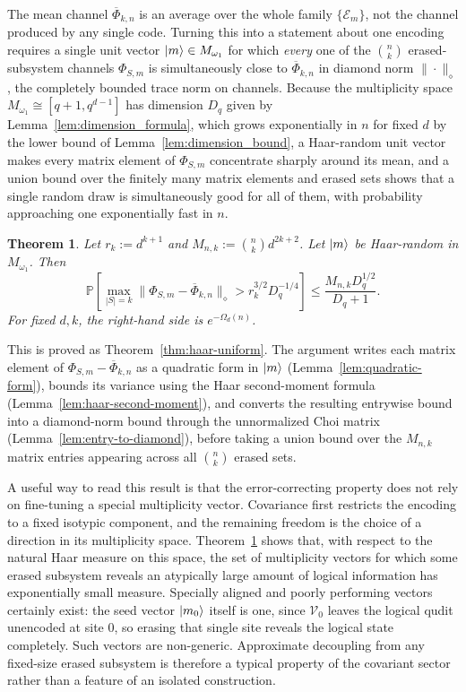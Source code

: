 \documentclass[10pt,twocolumn,superscriptaddress,aps,amsmath,amssymb,citeautoscript,floatfix,prx]{revtex4-2}
\newtheorem{theorem}{Theorem}
\theoremstyle{plain}
\theoremstyle{plain}
\theoremstyle{plain}
\theoremstyle{plain}
\theoremstyle{plain}
\theoremstyle{plain}
\theoremstyle{plain}
\theoremstyle{definition}
\theoremstyle{plain}
\begin{document}
The mean channel $\overline\Phi_{k,n}$ is an average over the whole family $\{\mathcal E_m\}$, not the channel produced by any single code. 
Turning this into a statement about one encoding requires a single unit vector $\ket m\in M_{\omega_1}$ for which \emph{every} one of the $\binom nk$ erased-subsystem channels $\Phi_{S,m}$ is 
simultaneously close to $\overline\Phi_{k,n}$ in diamond norm $\|\cdot\|_\diamond$, the completely bounded trace norm on channels. 
Because the multiplicity space $M_{\omega_1}\cong[q+1,q^{d-1}]$ has dimension $D_q$ given by Lemma~\ref{lem:dimension_formula}, 
which grows exponentially in $n$ for fixed $d$ by the lower bound of Lemma~\ref{lem:dimension_bound}, a Haar-random unit vector makes every 
matrix element of $\Phi_{S,m}$ concentrate sharply around its mean, and a union bound over the finitely many matrix elements and erased sets shows that a single random draw 
is simultaneously good for all of them, with probability approaching one exponentially fast in $n$.

\begin{theorem}\label{thrm:main_haar_typical}
Let $r_k:=d^{k+1}$ and $M_{n,k}:=\binom nk d^{2k+2}$. Let $\ket m$ be Haar-random in $M_{\omega_1}$. Then
$$
\mathbb P\left[
\max_{|S|=k}
\|\Phi_{S,m}-\overline\Phi_{k,n}\|_\diamond
>r_k^{3/2}D_q^{-1/4}
\right]
\le
\frac{M_{n,k}D_q^{1/2}}{D_q+1}.
$$
For fixed $d,k$, the right-hand side is $e^{-\Omega_d(n)}$.
\end{theorem}

This is proved as Theorem~\ref{thm:haar-uniform}. The argument writes each matrix element of $\Phi_{S,m}-\overline\Phi_{k,n}$ as a quadratic form
in $\ket m$ (Lemma~\ref{lem:quadratic-form}), bounds its variance using the Haar second-moment formula (Lemma~\ref{lem:haar-second-moment}),
and converts the resulting entrywise bound into a diamond-norm bound through the unnormalized Choi matrix (Lemma~\ref{lem:entry-to-diamond}), 
before taking a union bound over the $M_{n,k}$ matrix entries appearing across all $\binom nk$ erased sets.

A useful way to read this result is that the error-correcting property does not rely on fine-tuning a special multiplicity vector. 
Covariance first restricts the encoding to a fixed isotypic component, and the remaining freedom is the choice of a direction in its multiplicity space. 
Theorem~\ref{thrm:main_haar_typical} shows that, with respect to the natural Haar measure on this space, the set of multiplicity vectors
for which some erased subsystem reveals an atypically large amount of logical information has exponentially small measure. 
Specially aligned and poorly performing vectors certainly exist: the seed vector $\ket{m_0}$ itself is one, since $\mathcal{V}_0$ 
leaves the logical qudit unencoded at site $0$, so erasing that single site reveals the logical state completely. 
Such vectors are non-generic. Approximate decoupling from any fixed-size erased subsystem is therefore a typical property of the covariant sector rather than 
a feature of an isolated construction.
\end{document}
